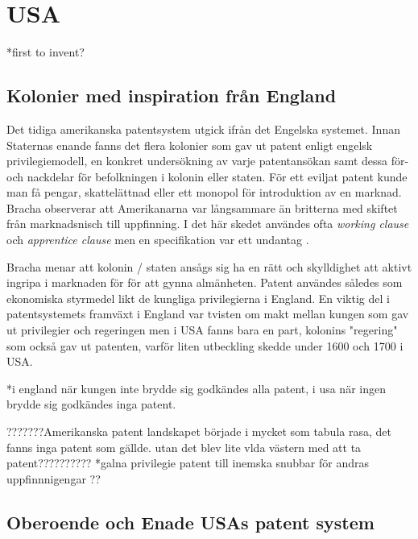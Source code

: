 \section{USA} %
*first to invent?

\subsection{Kolonier med inspiration från England} %

Det tidiga amerikanska patentsystem utgick ifrån det Engelska systemet. Innan Staternas enande fanns det
flera kolonier som gav ut patent enligt engelsk privilegiemodell, en konkret undersökning av varje
patentansökan samt dessa för- och nackdelar för befolkningen i kolonin eller staten. För ett eviljat
patent kunde man få pengar, skattelättnad eller ett monopol för introduktion av en marknad. Bracha
observerar att Amerikanarna var långsammare än britterna med skiftet från marknadsnisch till
uppfinning\cite{bracha}. I det här skedet användes ofta \emph{working clause} och \emph{apprentice
clause} men en specifikation var ett undantag \cite{bracha}.

Bracha menar att kolonin / staten ansågs sig ha en rätt och skylldighet att aktivt ingripa i marknaden
för för att gynna almänheten\cite{bracha}. Patent användes således som ekonomiska styrmedel likt de
kungliga privilegierna i England. En viktig del i patentsystemets framväxt i England var tvisten om makt
mellan kungen som gav ut privilegier och regeringen men i USA fanns bara en part, kolonins "regering"
som också gav ut patenten, varför liten utbeckling skedde under 1600 och 1700 i USA.

*i england när kungen inte brydde sig godkändes alla patent, i usa när ingen brydde sig godkändes inga
patent.

???????Amerikanska patent landskapet började i mycket som tabula rasa, det fanns inga patent som gällde.
utan det blev lite vlda västern med att ta patent?????????? *galna privilegie patent till inemska
snubbar för andras uppfinnnigengar ??

\subsection{Oberoende och Enade USAs patent system} %


